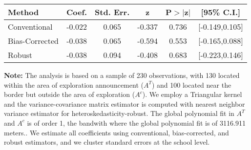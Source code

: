 \begin{table}[htbp]\centering
 \footnotesize 
\begin{tabular}{lccccc}
\hline\hline
Method & Coef. & Std. Err. & z & P$>|$z$|$ & [95\% C.I.] \\ 
\hline \hline  
Conventional & -0.022 & 0.065 & -0.337 & 0.736 & [-0.149,0.105] \\ 
 Bias-Corrected & -0.038 & 0.065 & -0.594 & 0.553 & [-0.165,0.088] \\ 
Robust & -0.038 & 0.094 & -0.408 & 0.683 & [-0.223,0.146] \\ 
  \hline\hline
\end{tabular}
\label{table:rd}
\begin{tablenotes} 
  \justifying \tiny \textbf{Note: }    
   The analysis is based on a sample of 230 observations, with 130 located within the area of exploration announcement ($A^{T}$) and 100 located near the border but outside the area of exploration  ($A^{c}$). 
           We employ a Triangular kernel and the variance-covariance matrix estimator is computed with nearest neighbor variance estimator for heteroskedasticity-robust. The global polynomial fit in  $A^{T}$ and $A^{c}$ is of order 1, the bandwith where the global polynomial fit is of 3116.911 meters.. We estimate all coefficients using conventional, bias-corrected, and robust estimators, and we cluster standard errors at the school level. \end{tablenotes} 
 \end{table} 
